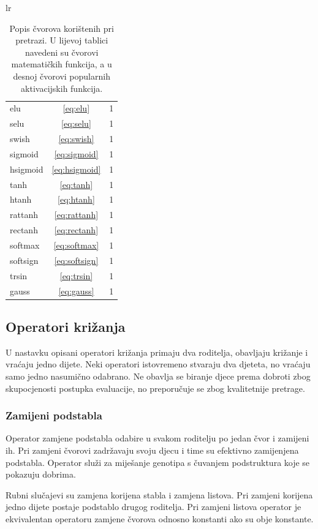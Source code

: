 \documentclass[times, utf8, numeric, diplomski]{fer}
\begin{document}
\begin{table}[H]
\begin{tabular}[t]{lr}
\begin{tabular}[t]{l|c|r}
elu		& \eqref{eq:elu}			& 1 \\
selu		& \eqref{eq:selu}		& 1 \\
swish	& \eqref{eq:swish}		& 1 \\
sigmoid	& \eqref{eq:sigmoid}		& 1 \\
hsigmoid & \eqref{eq:hsigmoid}	& 1 \\
tanh		& \eqref{eq:tanh}		& 1 \\
htanh 	& \eqref{eq:htanh}		& 1 \\
rattanh & \eqref{eq:rattanh}		& 1 \\
rectanh & \eqref{eq:rectanh}		& 1 \\
softmax	& \eqref{eq:softmax}		& 1 \\
softsign	& \eqref{eq:softsign}	& 1 \\
trsin 	& \eqref{eq:trsin}		& 1 \\
gauss	& \eqref{eq:gauss}		& 1 \\
\end{tabular}
\end{tabular}
\caption{Popis čvorova korištenih pri pretrazi. U lijevoj tablici navedeni su čvorovi matematičkih funkcija, a u desnoj čvorovi popularnih aktivacijskih funkcija.}
\end{table}


\subsection{Operatori križanja}
U nastavku opisani operatori križanja primaju dva roditelja, obavljaju križanje i vraćaju jedno dijete. Neki operatori istovremeno stvaraju dva djeteta, no vraćaju samo jedno nasumično odabrano. Ne obavlja se biranje djece prema dobroti zbog skupocjenosti postupka evaluacije, no preporučuje se zbog kvalitetnije pretrage.

\subsubsection{Zamijeni podstabla}
Operator zamjene podstabla odabire u svakom roditelju po jedan čvor i zamijeni ih. Pri zamjeni čvorovi zadržavaju svoju djecu i time su efektivno zamijenjena podstabla. Operator služi za miješanje genotipa s čuvanjem podstruktura koje se pokazuju dobrima. %

Rubni slučajevi su zamjena korijena stabla i zamjena listova. Pri zamjeni korijena jedno dijete postaje podstablo drugog roditelja. Pri zamjeni listova operator je ekvivalentan operatoru zamjene čvorova odnosno konstanti ako su obje konstante.
\end{document}
